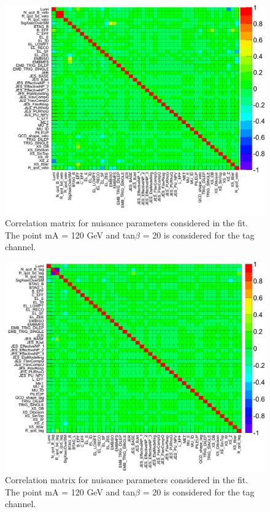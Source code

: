 

\begin{figure}[htp]
     \begin{center}

           \includegraphics[width=\textwidth]{figure/np_check/matrix_veto.png}
    \end{center}
    \caption{ Correlation matrix for nuisance parameters considered in the fit. The point mA = 120 GeV and tan$\beta$ = 20 is considered for the tag channel.} 
    \label{fig:np_correlation_veto}
\end{figure}
\begin{figure}[htp]
     \begin{center}

           \includegraphics[width=\textwidth]{figure/np_check/matrix_tag.png}
    \end{center}
    \caption{ Correlation matrix for nuisance parameters considered in the fit. The point mA = 120 GeV and tan$\beta$ = 20 is considered for the tag channel.} 
    \label{fig:np_correlation_tag}
\end{figure}

